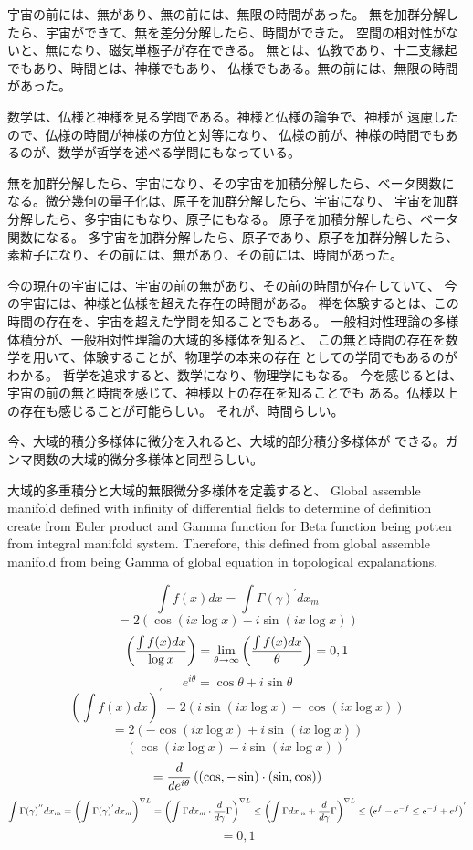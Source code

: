 \documentclass{jsarticle}
\begin{document}
      宇宙の前には、無があり、無の前には、無限の時間があった。
   無を加群分解したら、宇宙ができて、無を差分分解したら、時間ができた。
   空間の相対性がないと、無になり、磁気単極子が存在できる。
   無とは、仏教であり、十二支縁起でもあり、時間とは、神様でもあり、
   仏様でもある。無の前には、無限の時間があった。


      数学は、仏様と神様を見る学問である。神様と仏様の論争で、神様が
   遠慮したので、仏様の時間が神様の方位と対等になり、
   仏様の前が、神様の時間でもあるのが、数学が哲学を述べる学問にもなっている。


      無を加群分解したら、宇宙になり、その宇宙を加積分解したら、ベータ関数に
   なる。微分幾何の量子化は、原子を加群分解したら、宇宙になり、
   宇宙を加群分解したら、多宇宙にもなり、原子にもなる。
   原子を加積分解したら、ベータ関数になる。
   多宇宙を加群分解したら、原子であり、原子を加群分解したら、
   素粒子になり、その前には、無があり、その前には、時間があった。


       今の現在の宇宙には、宇宙の前の無があり、その前の時間が存在していて、
   今の宇宙には、神様と仏様を超えた存在の時間がある。
   禅を体験するとは、この時間の存在を、宇宙を超えた学問を知ることでもある。
       一般相対性理論の多様体積分が、一般相対性理論の大域的多様体を知ると、
   この無と時間の存在を数学を用いて、体験することが、物理学の本来の存在
   としての学問でもあるのがわかる。
   哲学を追求すると、数学になり、物理学にもなる。
   今を感じるとは、宇宙の前の無と時間を感じて、神様以上の存在を知ることでも
   ある。仏様以上の存在も感じることが可能らしい。
   それが、時間らしい。



    今、大域的積分多様体に微分を入れると、大域的部分積分多様体が
   できる。ガンマ関数の大域的微分多様体と同型らしい。　


      大域的多重積分と大域的無限微分多様体を定義すると、
   Global assemble manifold defined with infinity of differential
   fields to determine of definition create from Euler product and
   Gamma function for Beta function being potten from integral manifold
   system. Therefore, this defined from global assemble manifold from
   being Gamma of global equation in topological expalanations.

   $$ \int f(x)dx = \int \Gamma(\gamma)^{'}dx_m $$
   $$ = 2 (\cos (i x \log x) - i \sin(i x \log x)) $$
   $$ \left({{\int f(x) dx} \over \log x}\right) = \lim_{\theta \to \infty}
    \left({{\int f(x) dx} \over \theta}\right) = 0,1 $$
    $$ e^{i \theta} = \cos \theta + i \sin \theta $$
    $$ \left({\int f(x) dx}\right)^{'} = 2 (i \sin(i x \log x) - \cos (i x \log
    x)) $$
    $$ = 2(- \cos(i x \log x) + i \sin(i x \log x)) $$
    $$ (\cos (i x \log x) - i \sin(i x \log x))^{'} $$
    $$ = {d \over {d {e^{i\theta}}}}\left((\cos, - \sin )\cdot
    (\sin, \cos)\right)  $$
    $$ \int \Gamma(\gamma)^{''}dx_m = \left({\int \Gamma(\gamma)^{'}}dx_m
    \right)^{\nabla L} = \left({{\int \Gamma dx_m} \cdot {{d \over d\gamma}
    \Gamma}}\right)^{\nabla L} \le 
    \left({\int \Gamma dx_m + {d \over d\gamma}\Gamma}\right)^{\nabla L} \le 
    \left({e^{f} - e^{-f}} \le {e^{-f} + e^{f}}\right)^{'}  $$
    $$ = 0,1 $$
\end{document}
